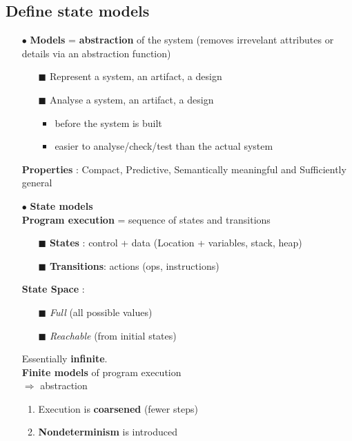\documentclass{article}
\begin{document}
\subsection{Define state models}
\vspace{-0.5cm}
\begin{multicols}{2}
\begin{itemize}
    \item [$\bullet$]\textbf{Models} = \textbf{abstraction} of the system (removes irrevelant attributes or details via an abstraction function)
    \begin{itemize}
        \item [$\blacksquare$]Represent a system, an artifact, a design

        \item [$\blacksquare$]Analyse a system, an artifact, a design
        \begin{itemize}
            \item before the system is built
            \item easier to analyse/check/test than the actual system
        \end{itemize}
    \end{itemize}
    \textbf{Properties} : Compact, Predictive, Semantically meaningful and Sufficiently general
    
    \vfill\null
    \columnbreak
    \item [$\bullet$]\textbf{State models}  \\ \textbf{Program execution} = sequence of states and transitions
    \begin{itemize}
        \item [$\blacksquare$]\textbf{States} : control + data (Location + variables, stack, heap)

        \item [$\blacksquare$]\textbf{Transitions}: actions (ops, instructions)
    \end{itemize}
    \textbf{State Space} :
    \begin{itemize}
        \item [$\blacksquare$]\textit{Full} (all possible values)
        \item [$\blacksquare$]\textit{Reachable} (from initial states)
    \end{itemize}
    Essentially \textbf{infinite}. \\
    \textbf{Finite models} of program execution \\$\Rightarrow$ abstraction
    \begin{enumerate}
        \item Execution is \textbf{coarsened} (fewer steps)
        \item \textbf{Nondeterminism} is introduced
    \end{enumerate}
    \vfill\null
\end{itemize}
\end{multicols}
\vspace{-0.9cm}
\end{document}
